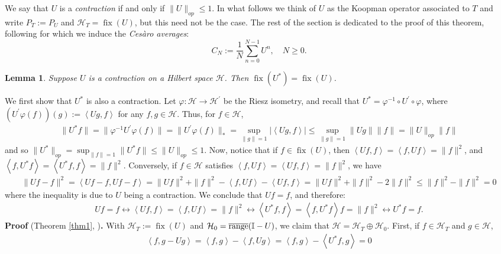 \documentclass[11pt]{report}
\newcommand{\mc}[1]{\mathcal{#1}}
\newcommand{\ip}[2]{\left\langle#1,#2\right\rangle }
\DeclareMathOperator{\fix}{fix}
\DeclareMathOperator{\ran}{range}
\newtheorem{lemma}{Lemma}[section]
\theoremstyle{definition}
\begin{document}
    We say that $U$ is a \textit{contraction} if and only if $\|U\|_{op}\leq 1$.
    In what follows we think of $U$ as the Koopman operator associated to $T$
    and write $P_T:=P_{U}$ and $\mc{H}_T=\fix(U)$, but this need not be the case. The rest of the section is dedicated to the proof of
    this theorem, following \cite[theorem 1.3.1]{Weber_2000} for which we induce
    the \textit{Ces\`aro averages}:
    \[C_N:=\frac{1}{N}\sum_{n=0}^{N-1}U^n,\quad N\geq 0.\]
    \begin{lemma}\label{lem4}
        Suppose $U$ is a contraction on a Hilbert space $\mc{H}$. Then
        $\fix(U^\ast)=\fix(U)$. 
    \end{lemma}
     We first show that $U^\ast$ is also a
    contraction. Let $\varphi:\mc{H}\rightarrow\mc{H}^\prime$ be the Riesz
    isometry, and recall that $U^\ast=\varphi^{-1}\circ U^\prime\circ\varphi$,
    where $(U^\prime\varphi(f))(g):=\ip{Ug}{f}$ for any $f,g\in\mc{H}$. Thus,
    for $f\in\mc{H}$,
    \begin{align*}
        \|U^\ast f\|=\|\varphi^{-1}U^\prime\varphi(f)\|=\|U^\prime\varphi(f)\|_\ast=\sup_{\|g\|=1}|\ip{Ug}{f}|\leq\sup_{\|g\|=1}\|Ug\|\|f\|=\|U\|_{op}\|f\|
    \end{align*}
    and so $\|U^\ast\|_{op}=\sup_{\|f\|=1}\|U^\ast f\|\leq\|U\|_{op}\leq 1$.
    Now, notice that if $f\in\fix(U)$, then $\ip{Uf}{f}=\ip{f}{Uf}=\|f\|^2$, and
    $\ip{f}{U^\ast f}=\ip{U^\ast f}{f}=\|f\|^2$. Conversely, if $f\in\mc{H}$
    satisfies $\ip{f}{Uf}=\ip{Uf}{f}=\|f\|^2$, we have
    \begin{align*}
        \|Uf-f\|^2=\ip{Uf-f}{Uf-f}=\|Uf\|^2+\|f\|^2-\ip{f}{Uf}-\ip{Uf}{f}=\|Uf\|^2+\|f\|^2-2\|f\|^2\leq \|f\|^2-\|f\|^2=0
    \end{align*}
    where the inequality is due to $U$ being a contraction. We conclude that
    $Uf=f$, and therefore:
    \begin{align*}
        Uf=f\longleftrightarrow \ip{Uf}{f}=\ip{f}{Uf}=\|f\|^2\longleftrightarrow \ip{U^\ast f}{f}=\ip{f}{U^\ast f}{f}=\|f\|^2\longleftrightarrow U^\ast f=f.\tag*{$\qed$}
    \end{align*}
    \noindent\textbf{Proof} (Theorem \ref{thm1}, \cite[theorem 1.3.1]{Weber_2000})\textbf{.} With
    $\mc{H}_T:=\fix(U)$ and $\mc{H}_0=\overline{\ran}(\mbb{I}-U)$, we claim that
    $\mc{H}=\mc{H}_T\oplus\mc{H}_0$. First, if $f\in\mc{H}_T$ and $g\in\mc{H}$,
    \begin{align*}
        \ip{f}{g-Ug}=\ip{f}{g}-\ip{f}{Ug}=\ip{f}{g}-\ip{U^\ast f}{g}=0
    \end{align*}
\end{document}
